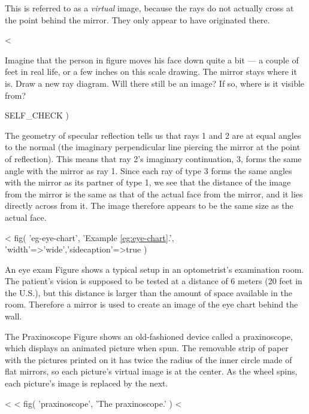 This is referred to as a \emph{virtual} image, because the
rays do not actually cross at the point behind the mirror.
They only appear to have originated there.

<%

Imagine that the person in figure  moves his face down
quite a bit --- a couple of feet in real life, or a few
inches on this scale drawing. The mirror stays where it is. Draw a new ray diagram. Will
there still be an image? If so, where is it visible from?

  SELF_CHECK
  ) %

The geometry of specular reflection tells us that rays 1 and
2 are at equal angles to the normal (the imaginary
perpendicular line piercing the mirror at the point of
reflection). This means that ray 2's imaginary continuation,
3, forms the same angle with the mirror as ray 1. Since
each ray of type 3 forms the same angles with the mirror
as its partner of type 1, we see that the distance of the
image from the mirror is the same as that of the actual face from
the mirror, and it lies directly across from it. The image
therefore appears to be the same size as the actual face.

<%
  fig(
    'eg-eye-chart',
    'Example \ref{eg:eye-chart}.',
    {'width'=>'wide','sidecaption'=>true}
  )

\begin{eg}{An eye exam}\label{eg:eye-chart}
Figure  shows a typical setup in an optometrist's examination room.
The patient's vision is supposed to be tested at a distance of 6 meters (20 feet in the U.S.),
but this distance is larger than the amount of space available in the room. Therefore a mirror is
used to create an image of the eye chart behind the wall.
\end{eg}

\begin{eg}{The Praxinoscope}
Figure  shows an old-fashioned device called
a praxinoscope, which displays an animated picture when spun.
The removable strip of paper with the pictures printed on it has twice
the radius of the inner circle made of flat mirrors, so each picture's
virtual image is at the center. As the wheel spins, each picture's image
is replaced by the next.
\end{eg}

<%
<%
  fig(
    'praxinoscope',
    'The praxinoscope.'
  )
<%

